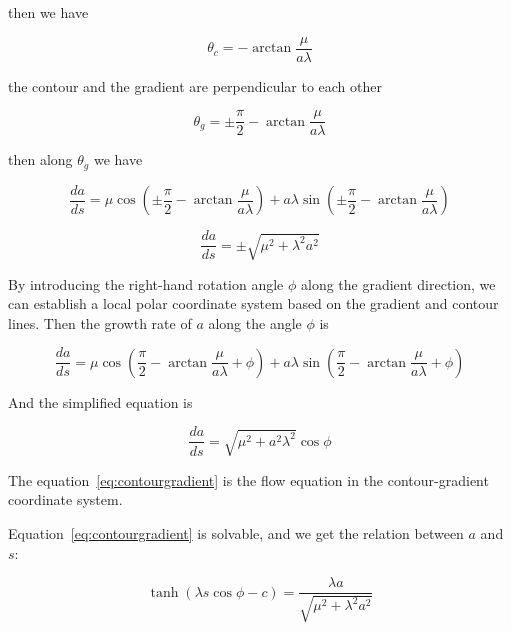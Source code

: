 then we have

\begin{equation}
    \theta_c = - \arctan \frac{\mu}{a \lambda}\label{eq:contourangle}
\end{equation}

the contour and the gradient are perpendicular to each other

\begin{equation}
    \theta_g = \pm \frac{\pi}{2} - \arctan \frac{\mu}{a \lambda}\label{eq:gradientangle}
\end{equation}

then along $\theta_g$ we have

\begin{equation}
    \frac{da}{ds} = \mu \cos (\pm \frac{\pi}{2} - \arctan \frac{\mu}{a \lambda}) + a \lambda \sin (\pm \frac{\pi}{2} - \arctan \frac{\mu}{a \lambda})
    \label{eq:alonggradient}
\end{equation}

\begin{equation}
    \frac{da}{ds} = \pm \sqrt{\mu^2 + \lambda^2 a^2}\label{eq:grad}
\end{equation}

By introducing the right-hand rotation angle $\phi$ along the gradient direction, we can establish a local polar coordinate system based on the gradient and contour lines.
Then the growth rate of $a$ along the angle $\phi$ is

\begin{equation}
    \frac{da}{ds} = \mu \cos (\frac{\pi}{2} - \arctan \frac{\mu}{a \lambda} + \phi) + a \lambda \sin (\frac{\pi}{2} - \arctan \frac{\mu}{a \lambda} + \phi)
    \label{eq:fourfold}
\end{equation}

And the simplified equation is

\begin{equation}
    \frac{da}{ds} = \sqrt {\mu^2 + a^2 \lambda^2} \cos \phi\label{eq:contourgradient}
\end{equation}

The equation~\eqref{eq:contourgradient} is the flow equation in the contour-gradient coordinate system.

Equation~\eqref{eq:contourgradient} is solvable, and we get the relation between $a$ and $s$:

\begin{equation}\label{eq:rel_a_s}
    \tanh(\lambda s \cos \phi - c) = \frac{\lambda a}{\sqrt{\mu^2 + \lambda^2 a^2}}
\end{equation}

